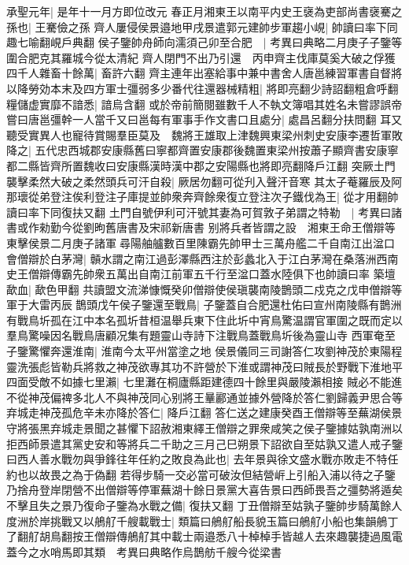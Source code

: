 承聖元年|{
	是年十一月方即位改元}
春正月湘東王以南平内史王襃為吏部尚書襃騫之孫也|{
	王騫儉之孫}
齊人屢侵侯景邉地甲戌景遣郭元建帥步軍趨小峴|{
	帥讀曰率下同趣七喻翻峴戶典翻}
侯子鑒帥舟師向濡須己卯至合肥　|{
	考異曰典略二月庚子子鑒等圍合肥克其羅城今從太清紀}
齊人閉門不出乃引還　丙申齊主伐庫莫奚大破之俘獲四千人雜畜十餘萬|{
	畜許六翻}
齊主連年出塞給事中兼中書舍人唐邕練習軍書自督將以降勞効本末及四方軍士彊弱多少番代往還器械精粗|{
	將即亮翻少詩詔翻粗倉呼翻}
糧儲虚實靡不諳悉|{
	諳烏含翻}
或於帝前簡閱雖數千人不執文簿唱其姓名未嘗謬誤帝嘗曰唐邕彊幹一人當千又曰邕每有軍事手作文書口且處分|{
	處昌呂翻分扶問翻}
耳又聽受實異人也寵待賞賜羣臣莫及　魏將王雄取上津魏興東梁州刺史安康李遷哲軍敗降之|{
	五代忠西城郡安康縣舊曰寧都齊置安康郡後魏置東梁州按蕭子顯齊書安康寧都二縣皆齊所置魏收曰安康縣漢時漢中郡之安陽縣也將即亮翻降戶江翻}
突厥土門襲擊柔然大破之柔然頭兵可汗自殺|{
	厥居勿翻可從刋入聲汗音寒}
其太子菴羅辰及阿那瓌從弟登注俟利登注子庫提並帥衆奔齊餘衆復立登注次子鐵伐為王|{
	從才用翻帥讀曰率下同復扶又翻}
土門自號伊利可汗號其妻為可賀敦子弟謂之特勒　|{
	考異曰諸書或作勑勤今從劉昫舊唐書及宋祁新唐書}
别將兵者皆謂之設　湘東王命王僧辯等東擊侯景二月庚子諸軍尋陽舳艫數百里陳霸先帥甲士三萬舟艦二千自南江出湓口會僧辯於白茅灣|{
	贑水謂之南江過彭澤縣西注於彭蠡北入于江白茅灣在桑落洲西南史王僧辯傳霸先帥衆五萬出自南江前軍五千行至湓口蓋水陸俱下也帥讀曰率}
築壇歃血|{
	歃色甲翻}
共讀盟文流涕慷慨癸卯僧辯使侯瑱襲南陵鵲頭二戍克之戊申僧辯等軍于大雷丙辰鵲頭戊午侯子鑒還至戰鳥|{
	子鑒蓋自合肥還杜佑曰宣州南陵縣有鵲洲有戰鳥圻孤在江中本名孤圻昔桓温舉兵東下住此圻中宵鳥驚温謂官軍圍之既而定以羣鳥驚噪因名戰鳥唐顧况集有題靈山寺詩下注戰鳥蓋戰鳥圻後為靈山寺}
西軍奄至子鑒驚懼奔還淮南|{
	淮南今太平州當塗之地}
侯景儀同三司謝答仁攻劉神茂於東陽程靈洗張彪皆勒兵將救之神茂欲專其功不許營於下淮或謂神茂曰賊長於野戰下淮地平四面受敵不如據七里瀨|{
	七里灘在桐廬縣距建德四十餘里與嚴陵瀨相接}
賊必不能進不從神茂偏禆多北人不與神茂同心别將王曅酈通並據外營降於答仁劉歸義尹思合等弃城走神茂孤危辛未亦降於答仁|{
	降戶江翻}
答仁送之建康癸酉王僧辯等至蕪湖侯景守將張黑弃城走景聞之甚懼下詔赦湘東繹王僧辯之罪衆咸笑之侯子鑒據姑孰南洲以拒西師景遣其黨史安和等將兵二千助之三月己巳朔景下詔欲自至姑孰又遣人戒子鑒曰西人善水戰勿與爭鋒往年任約之敗良為此也|{
	去年景與徐文盛水戰亦敗走不特任約也以故畏之為于偽翻}
若得步騎一交必當可破汝但結營㟁上引船入浦以待之子鑒乃捨舟登岸閉營不出僧辯等停軍蕪湖十餘日景黨大喜告景曰西師畏吾之彊勢將遁矣不擊且失之景乃復命子鑒為水戰之備|{
	復扶又翻}
丁丑僧辯至姑孰子鑒帥步騎萬餘人度洲於岸挑戰又以鵃䑠千艘載戰士|{
	類篇曰鵃䑠船長貌玉篇曰鵃䑠小船也集韻鵃丁了翻䑠胡鳥翻按王僧辯傳鵃䑠其中載士兩邉悉八十棹棹手皆越人去來趣襲捷過風電蓋今之水哨馬即其類　考異曰典略作烏鵲舫千艘今從梁書}
